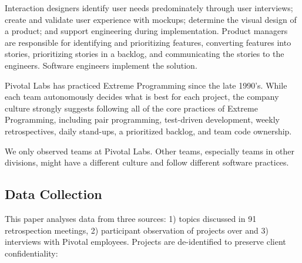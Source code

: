Interaction designers identify user needs predominately through user interviews; create and validate user experience with mockups; determine the visual design of a product; and support engineering during implementation. Product managers are responsible for identifying and prioritizing features, converting features into stories, prioritizing stories in a backlog, and communicating the stories to the engineers. Software engineers implement the solution. 

Pivotal Labs has practiced Extreme Programming \cite{BeckExtremeProgramming2004} since the late 1990's. While each team autonomously decides what is best for each project, the company culture strongly suggests following all of the core practices of Extreme Programming, including pair programming, test-driven development, weekly retrospectives, daily stand-ups, a prioritized backlog, and team code ownership. 

We only observed teams at Pivotal Labs. Other teams, especially teams in other divisions, might have a different culture and follow different software practices.

\subsection{Data Collection}
This paper analyses data from three sources: 1) topics discussed in 91 retrospection meetings, 2) participant observation of \numberOfObservedProjects{} projects over \durationOfResearchStudyPlural{} and 3) interviews with Pivotal employees. Projects are de-identified to preserve client confidentiality:

